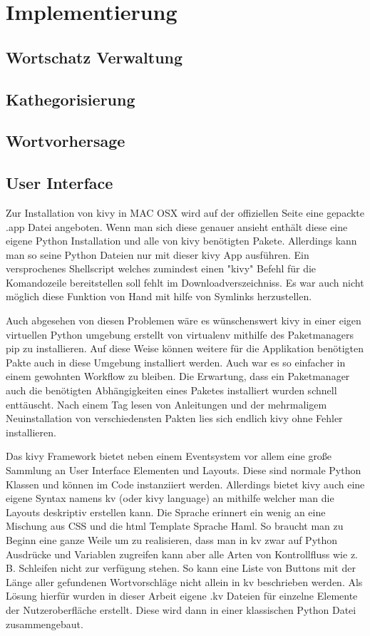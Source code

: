 \section{Implementierung}

	\subsection{Wortschatz Verwaltung}
	\subsection{Kathegorisierung}
	\subsection{Wortvorhersage}
    \newpage
    \subsection{User Interface}
    	Zur Installation von kivy in MAC OSX wird auf der offiziellen Seite eine gepackte .app Datei angeboten. Wenn man sich diese genauer ansieht enthält diese eine eigene Python Installation und alle von kivy benötigten Pakete. Allerdings kann man so seine Python Dateien nur mit dieser kivy App ausführen. Ein versprochenes Shellscript welches zumindest einen "kivy" Befehl für die Komandozeile bereitstellen soll fehlt im Downloadverszeichniss. Es war auch nicht möglich diese Funktion von Hand mit hilfe von Symlinks herzustellen.
        
        Auch abgesehen von diesen Problemen wäre es wünschenswert kivy in einer eigen virtuellen Python umgebung erstellt von virtualenv mithilfe des Paketmanagers pip zu installieren. Auf diese Weise können weitere für die Applikation benötigten Pakte auch in diese Umgebung installiert werden. Auch war es so einfacher in einem gewohnten Workflow zu bleiben. Die Erwartung, dass ein Paketmanager auch die benötigten Abhängigkeiten eines Paketes installiert wurden schnell enttäuscht. Nach einem Tag lesen von Anleitungen und der mehrmaligem Neuinstallation von verschiedensten Pakten lies sich endlich kivy ohne Fehler installieren.
        
        Das kivy Framework bietet neben einem Eventsystem vor allem eine große Sammlung an User Interface Elementen und Layouts. Diese sind normale Python Klassen und können im Code instanziiert werden. Allerdings bietet kivy auch eine eigene Syntax namens kv (oder kivy language) an mithilfe welcher man die Layouts deskriptiv erstellen kann. Die Sprache erinnert ein wenig an eine Mischung aus CSS und die html Template Sprache Haml. So braucht man zu Beginn eine ganze Weile um zu realisieren, dass man in kv zwar auf Python Ausdrücke und Variablen zugreifen kann aber alle Arten von Kontrollfluss wie z. B. Schleifen nicht zur verfügung stehen. So kann eine Liste von Buttons mit der Länge aller gefundenen Wortvorschläge nicht allein in kv beschrieben werden. Als Lösung hierfür wurden in dieser Arbeit eigene .kv Dateien für einzelne Elemente der Nutzeroberfläche erstellt. Diese wird dann in einer klassischen Python Datei zusammengebaut.